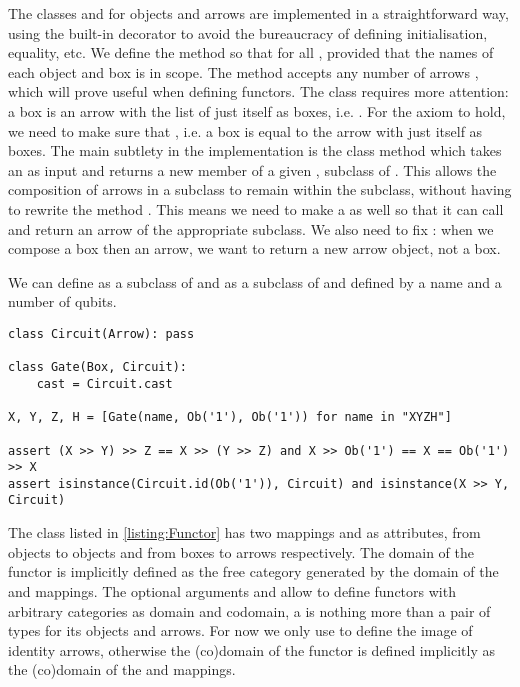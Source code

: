 The classes  and  for objects and arrows are implemented in a straightforward way, using the built-in  decorator to avoid the bureaucracy of defining initialisation, equality, etc.
We define the method  so that  for all , provided that the names of each object and box is in scope.
The method  accepts any number of arrows , which will prove useful when defining functors.
The  class requires more attention: a box  is an arrow with the list of just itself as boxes, i.e. .
For the axiom  to hold, we need to make sure that , i.e. a box is equal to the arrow with just itself as boxes.
The main subtlety in the implementation is the class method  which takes an  as input and returns a new member of a given , subclass of .
This allows the composition of arrows in a subclass to remain within the subclass, without having to rewrite the method .
This means we need to make  a  as well so that it can call  and return an arrow of the appropriate subclass.
We also need to fix : when we compose a box then an arrow, we want to return a new arrow object, not a box.

\begin{example}\label{example:Circuit}
We can define  as a subclass of  and  as a subclass of  and  defined by a name and a number of qubits.

\begin{verbatim}
class Circuit(Arrow): pass

class Gate(Box, Circuit):
    cast = Circuit.cast

X, Y, Z, H = [Gate(name, Ob('1'), Ob('1')) for name in "XYZH"]

assert (X >> Y) >> Z == X >> (Y >> Z) and X >> Ob('1') == X == Ob('1') >> X
assert isinstance(Circuit.id(Ob('1')), Circuit) and isinstance(X >> Y, Circuit)
\end{verbatim}
\end{example}

The  class listed in \ref{listing:Functor} has two mappings  and  as attributes, from objects to objects and from boxes to arrows respectively.
The domain of the functor is implicitly defined as the free category generated by the domain of the  and  mappings.
The optional arguments  and  allow to define functors with arbitrary categories as domain and codomain, a  is nothing more than a pair of types for its objects and arrows.
For now we only use  to define the image of identity arrows, otherwise the (co)domain of the functor is defined implicitly as the (co)domain of the  and  mappings.

